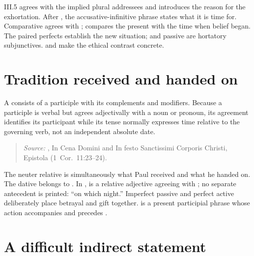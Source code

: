 \begin{courseunit}{III.5}
 agrees with the implied plural addressees and introduces the
reason for the exhortation. After , the accusative-infinitive
phrase  states what it is time for. Comparative
 agrees with ;  compares
the present with the time when belief began. The paired perfects establish the
new situation;  and passive  are hortatory
subjunctives.  and  make the ethical
contrast concrete.

\section{Tradition received and handed on}

A  consists of a participle with its complements and
modifiers. Because a participle is verbal but agrees adjectivally with a noun
or pronoun, its agreement identifies its participant while its tense normally
expresses time relative to the governing verb, not an independent absolute
date.

\begin{quote}

\emph{Source:} \Missal, In Cena Domini and In festo Sanctissimi Corporis
Christi, Epistola (1~Cor.~11:23--24).
\end{quote}

The neuter relative  is simultaneously what Paul received and what
he handed on. The dative  belongs to . In
,  is a relative adjective agreeing with
; no separate antecedent is printed: ``on which night.'' Imperfect passive
 and perfect active  deliberately place
betrayal and gift together.  is a present participial
phrase whose action accompanies and precedes .

\section{A difficult indirect statement}

\begin{quote}


\end{quote}
\end{courseunit}

